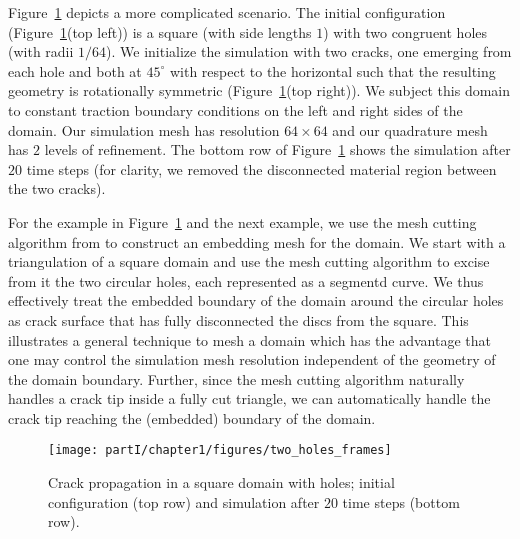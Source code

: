 Figure~\ref{fig:chap1.examples.propagation.two_holes} depicts a more complicated scenario. The initial configuration (Figure~\ref{fig:chap1.examples.propagation.two_holes}(top left)) is a square (with side lengths $1$) with two congruent holes (with radii $1/64$). We initialize the simulation with two cracks, one emerging from each hole and both at $45^{\circ}$ with respect to the horizontal such that the resulting geometry is rotationally symmetric (Figure~\ref{fig:chap1.examples.propagation.two_holes}(top right)). We subject this domain to constant traction boundary conditions on the left and right sides of the domain. Our simulation mesh has resolution $64 \times 64$ and our quadrature mesh has $2$ levels of refinement. The bottom row of Figure~\ref{fig:chap1.examples.propagation.two_holes} shows the simulation after $20$ time steps (for clarity, we removed the disconnected material region between the two cracks).

For the example in Figure~\ref{fig:chap1.examples.propagation.two_holes} and the next example, we use the mesh cutting algorithm from \cite{Sifakis07} to construct an embedding mesh for the domain. We start with a triangulation of a square domain and use the mesh cutting algorithm to excise from it the two circular holes, each represented as a segmentd curve. We thus effectively treat the embedded boundary of the domain around the circular holes as crack surface that has fully disconnected the discs from the square. This illustrates a general technique to mesh a domain which has the advantage that one may control the simulation mesh resolution independent of the geometry of the domain boundary. Further, since the mesh cutting algorithm naturally handles a crack tip inside a fully cut triangle, we can automatically handle the crack tip reaching the (embedded) boundary of the domain.

\setlength{\figurewidth}{\textwidth}
\begin{figure}[htbp]
\centering
\texttt{[image: partI/chapter1/figures/two\_holes\_frames]}
\caption{Crack propagation in a square domain with holes; initial configuration (top row) and simulation after $20$ time steps (bottom row).}
\label{fig:chap1.examples.propagation.two_holes}
\end{figure}

